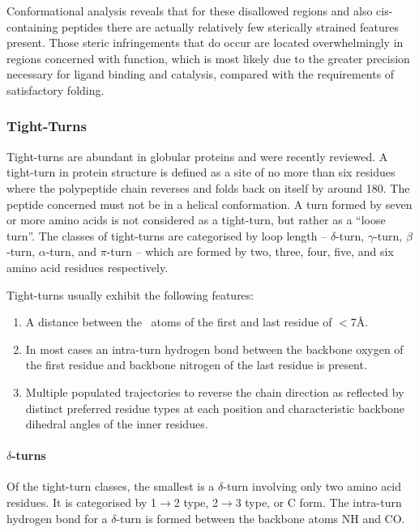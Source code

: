 Conformational analysis reveals that for these disallowed regions and also cis-containing peptides\cite{NATIVE:Her91} there are actually relatively few sterically strained features present. Those steric infringements that do occur are located overwhelmingly in regions concerned with function, which is most likely due to the greater precision necessary for ligand binding and catalysis, compared with the requirements of satisfactory folding. 








\subsubsection{Tight-Turns}
\label{section:intro:tightturns}

Tight-turns are abundant in globular proteins and were recently reviewed\cite{STRUCTURE:Cho2000}. A tight-turn in protein structure is defined as a site of no more than six residues where the polypeptide chain reverses and folds back on itself by around 180\degree. The peptide concerned must not be in a helical conformation. A turn formed by seven or more amino acids is not considered as a tight-turn, but rather as a ``loose turn''. The classes of tight-turns are categorised by loop length -- $\delta$-turn\cite{STRUCTURE:Ton80}, $\gamma$-turn\cite{STRUCTURE:Nem72,STRUCTURE:Mil88}, $\beta$-turn\cite{STRUCTURE:Mil86,STRUCTURE:Mil87,STRUCTURE:Hut94}, $\alpha$-turn\cite{STRUCTURE:Ton80,STRUCTURE:Pav96}, and $\pi$-turn\cite{STRUCTURE:Raj96,STRUCTURE:Kim76} -- which are formed by two, three, four, five, and six amino acid residues respectively. 

Tight-turns usually exhibit the following
features: 
\begin{enumerate} \isep
\item A distance between the \ca\ atoms of the first and last residue of $<$7\AA.\
\item In most cases an intra-turn hydrogen bond between the backbone oxygen of the first residue and backbone nitrogen of the last residue is present.
\item Multiple populated trajectories to reverse the chain direction as reflected by distinct preferred residue types at each position and characteristic backbone dihedral angles of the inner residues.
\end{enumerate}

\paragraph{$\delta$-turns} \isep
Of the tight-turn classes, the smallest is a $\delta$-turn involving only two amino acid residues. It is categorised by 1$\rightarrow$2 type, 2$\rightarrow$3 type, or C form. The intra-turn hydrogen bond for a $\delta$-turn is formed between the backbone atoms NH and CO. 

